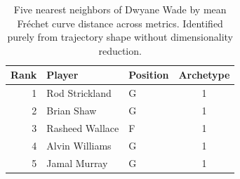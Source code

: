 \begin{table}[htbp]
  \centering\small
  \begin{tabular}{rllc}
    \toprule
    Rank & Player & Position & Archetype \\
    \midrule
    1 & Rod Strickland & G & 1 \\
    2 & Brian Shaw & G & 1 \\
    3 & Rasheed Wallace & F & 1 \\
    4 & Alvin Williams & G & 1 \\
    5 & Jamal Murray & G & 1 \\
    \bottomrule
  \end{tabular}
  \caption{Five nearest neighbors of Dwyane Wade by mean Fr\'{e}chet curve distance across metrics. Identified purely from trajectory shape without dimensionality reduction.}
  \label{tab:Dwyane_Wade_frechet_curve_neighbors}
\end{table}

